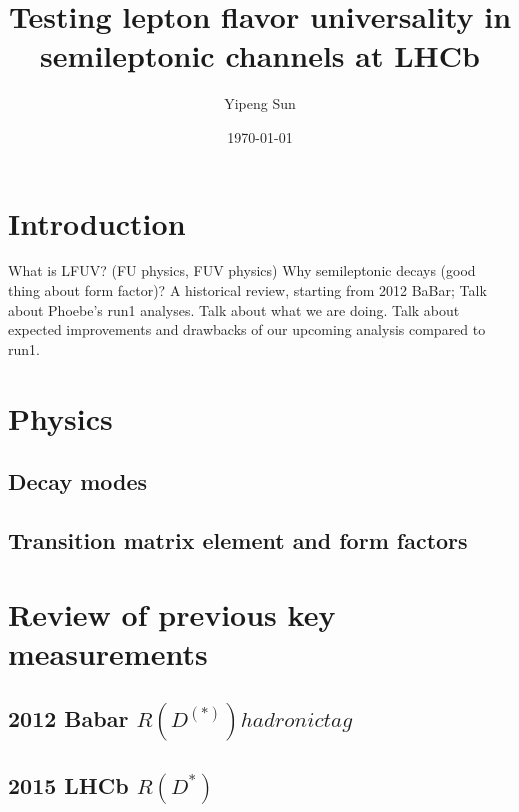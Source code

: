 \documentclass[10pt]{article}
\title{Testing lepton flavor universality in semileptonic channels at LHCb}
\author{Yipeng Sun}
\date{\today}
\begin{document}
\maketitle

\section{Introduction}
What is LFUV? (FU physics, FUV physics)
Why semileptonic decays (good thing about form factor)?
A historical review, starting from 2012 BaBar;
Talk about Phoebe's run1 analyses.
Talk about what we are doing.
Talk about expected improvements and drawbacks of our upcoming analysis compared
to run1.

\section{Physics}
\subsection{Decay modes}


\subsection{Transition matrix element and form factors}


\section{Review of previous key measurements}

\subsection{2012 Babar $R(D^{(*)}) hadronic tag$}

\subsection{2015 LHCb $R(D^{*})$}
\end{document}
